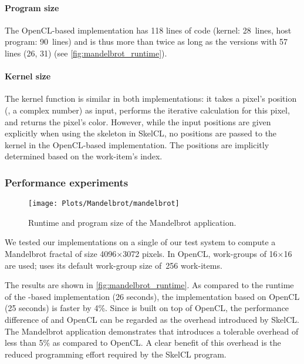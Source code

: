 \paragraph{Program size}
The OpenCL-based implementation has 118 lines of code (kernel: 28~lines, host program: 90~lines) and is thus more than twice as long as the \SkelCL versions with 57 lines (26, 31) (see \autoref{fig:mandelbrot_runtime}).

\paragraph{Kernel size}
The kernel function is similar in both implementations: it takes a pixel's position (\ie, a complex number) as input, performs the iterative calculation for this pixel, and returns the pixel's color.
However, while the input positions are given explicitly when using the \map skeleton in SkelCL, no positions are passed to the kernel in the OpenCL-based implementation.
The positions are implicitly determined based on the work-item's index.

\subsubsection*{Performance experiments}
\label{sec:mandelbrot:performance}

\begin{figure}[tb]
    \centering
    \texttt{[image: Plots/Mandelbrot/mandelbrot]}
    \caption{Runtime and program size of the Mandelbrot application.}
    \label{fig:mandelbrot_runtime}
\end{figure}%


We tested our implementations on a single \GPU of our test system to compute a Mandelbrot fractal of size 4096$\times$3072 pixels.
In OpenCL, work-groups of 16$\times$16 are used; \SkelCL uses its default work-group size of~256 work-items.

The results are shown in \autoref{fig:mandelbrot_runtime}.
As compared to the runtime of the \SkelCL-based implementation (26 seconds), the implementation based on OpenCL (25 seconds) is faster by 4\%.
Since \SkelCL is built on top of OpenCL, the performance difference of \SkelCL and OpenCL can be regarded as the overhead introduced by SkelCL.
The Mandelbrot application demonstrates that \SkelCL introduces a tolerable overhead of less than 5\% as compared to OpenCL.
A clear benefit of this overhead is the reduced programming effort required by the SkelCL program.

